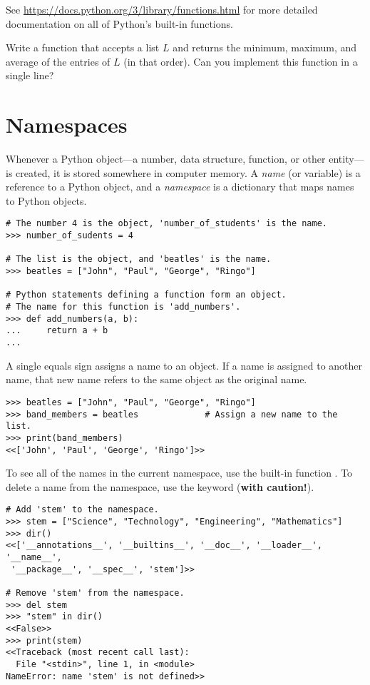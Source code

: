 See \url{https://docs.python.org/3/library/functions.html} for more detailed documentation on all of Python's built-in functions.

\begin{problem} %
Write a function that accepts a list $L$ and returns the minimum, maximum, and average of the entries of $L$ (in that order).
Can you implement this function in a single line?
\end{problem}

\section*{Namespaces} %

Whenever a Python object---a number, data structure, function, or other entity---is created, it is stored somewhere in computer memory.
A \emph{name} (or variable) is a reference to a Python object, and a \emph{namespace} is a dictionary that maps names to Python objects.

\begin{lstlisting}
# The number 4 is the object, 'number_of_students' is the name.
>>> number_of_sudents = 4

# The list is the object, and 'beatles' is the name.
>>> beatles = ["John", "Paul", "George", "Ringo"]

# Python statements defining a function form an object.
# The name for this function is 'add_numbers'.
>>> def add_numbers(a, b):
...     return a + b
...
\end{lstlisting}

A single equals sign assigns a name to an object.
If a name is assigned to another name, that new name refers to the same object as the original name.

\begin{lstlisting}
>>> beatles = ["John", "Paul", "George", "Ringo"]
>>> band_members = beatles             # Assign a new name to the list.
>>> print(band_members)
<<['John', 'Paul', 'George', 'Ringo']>>
\end{lstlisting}

To see all of the names in the current namespace, use the built-in function .
To delete a name from the namespace, use the  keyword (\textbf{with caution!}).

\begin{lstlisting}
# Add 'stem' to the namespace.
>>> stem = ["Science", "Technology", "Engineering", "Mathematics"]
>>> dir()
<<['__annotations__', '__builtins__', '__doc__', '__loader__', '__name__',
 '__package__', '__spec__', 'stem']>>

# Remove 'stem' from the namespace.
>>> del stem
>>> "stem" in dir()
<<False>>
>>> print(stem)
<<Traceback (most recent call last):
  File "<stdin>", line 1, in <module>
NameError: name 'stem' is not defined>>
\end{lstlisting}

